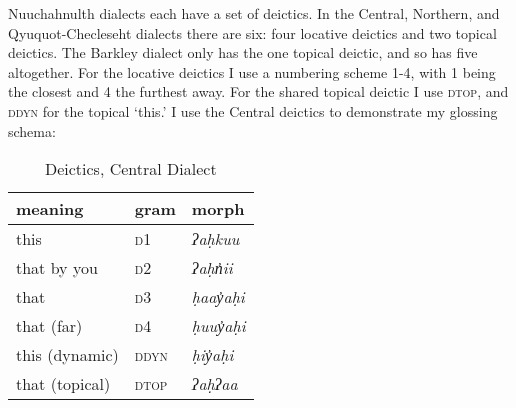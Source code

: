 Nuuchahnulth dialects each have a set of deictics. In the Central, Northern, and Qyuquot-Checleseht dialects there are six: four locative deictics and two topical deictics. The Barkley dialect only has the one topical deictic, and so has five altogether. For the locative deictics I use a numbering scheme 1-4, with 1 being the closest and 4 the furthest away. For the shared topical deictic I use \textsc{dtop}, and \textsc{ddyn} for the topical `this.' I use the Central deictics to demonstrate my glossing schema:

\begin{table}[ht]
\centering
\caption{Deictics, Central Dialect}
\label{table:deictics}
\begin{tabular}{lll}
meaning                            & gram               & morph                                         \\ \hline
\multicolumn{1}{|l|}{this} & \multicolumn{1}{l|}{\textsc{d1}}   & \multicolumn{1}{l|}{\textit{ʔaḥkuu}}                   \\ \hline
\multicolumn{1}{|l|}{that by you} & \multicolumn{1}{l|}{\textsc{d2}}   & \multicolumn{1}{l|}{\textit{ʔaḥn̓ii}}                   \\ \hline
\multicolumn{1}{|l|}{that} & \multicolumn{1}{l|}{\textsc{d3}}   & \multicolumn{1}{l|}{\textit{ḥaay̓aḥi}}                   \\ \hline
\multicolumn{1}{|l|}{that (far)} & \multicolumn{1}{l|}{\textsc{d4}}   & \multicolumn{1}{l|}{\textit{ḥuuy̓aḥi}}                   \\ \hline
\multicolumn{1}{|l|}{this (dynamic)} & \multicolumn{1}{l|}{\textsc{ddyn}}   & \multicolumn{1}{l|}{\textit{ḥiy̓aḥi}}                   \\ \hline
\multicolumn{1}{|l|}{that (topical)} & \multicolumn{1}{l|}{\textsc{dtop}}   & \multicolumn{1}{l|}{\textit{ʔaḥʔaa}}                   \\ \hline
\end{tabular}
\end{table}